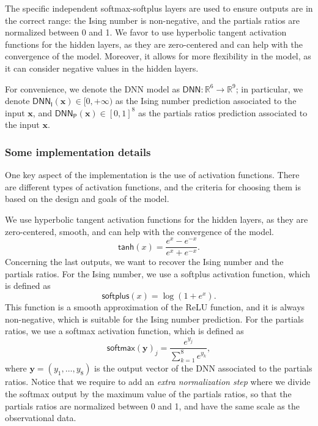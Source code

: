 \documentclass{psu-report}
\begin{document}
The specific independent softmax-softplus layers are used to ensure outputs
are in the correct range: the Ising number is non-negative, and the partials
ratios are normalized between 0 and 1.
We favor to use hyperbolic tangent activation functions for the hidden layers,
as they are zero-centered and can help with the convergence of the model.
Moreover, it allows for more flexibility in the model, as it can consider
negative values in the hidden layers.

For convenience, we denote the DNN model as \(\mathsf{DNN}: \mathbb{R}^6 \to
\mathbb{R}^9\); in particular, we denote
\(\mathsf{DNN}_\mathsf{I}(\mathbf{x})\in [0, +\infty)\)
as the Ising number prediction associated to the input \(\mathbf{x}\), and
\(\mathsf{DNN}_\mathsf{P}(\mathbf{x}) \in [0, 1]^8\)
as the partials ratios prediction associated to the input \(\mathbf{x}\).



\subsubsection{Some implementation details}

One key aspect of the implementation is the use of activation functions.
There are different types of activation functions, and the criteria for
choosing them is based on the design and goals of the model.

We use hyperbolic tangent activation functions for the hidden layers, as they
are zero-centered, smooth, and can help with the convergence of the model.
\[
    \mathsf{tanh}(x) = \frac{e^x - e^{-x}}{e^x + e^{-x}}.
\]
Concerning the last outputs, we want to recover the Ising number and the
partials ratios.
For the Ising number, we use a softplus activation function, which is defined as
\[
    \mathsf{softplus}(x) = \log(1 + e^x).
\]
This function is a smooth approximation of the ReLU function, and it is always
non-negative, which is suitable for the Ising number prediction.
For the partials ratios, we use a softmax activation function, which is defined
as
\[
    \mathsf{softmax}(\mathbf{y})_j = \frac{e^{y_j}}{\sum_{k=1}^8 e^{y_k}},
\]
where \(\mathbf{y} = (y_1, \ldots, y_8)\) is the output vector of the DNN
associated to the partials ratios.
Notice that we require to add an \emph{extra normalization step} where we divide the
softmax output by the maximum value of the partials ratios, so that the
partials ratios are normalized between 0 and 1, and have the same scale as the
observational data.
\end{document}
